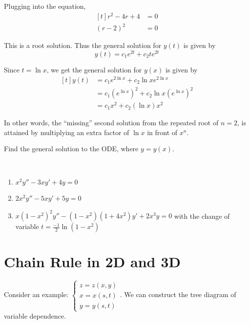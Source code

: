 \documentclass[11pt,fleqn]{book} %
\begin{document}
\begin{example}
    Plugging into the equation, 
    $$\begin{aligned}[t]
        r^2 - 4r + 4 & = 0 \\ 
        (r - 2)^2    & = 0
    \end{aligned}$$

    This is a  root solution. Thus the general solution for $y(t)$ is given by $$y(t) = c_1 e^{2t} + c_2 t e^{2t}$$

    Since $t = \ln{x}$, we get the general solution for $y(x)$ is given by 
    $$\begin{aligned}[t]
        y(t) & = c_1 e^{2 \ln{x}} + c_2 \ln{x} e^{2 \ln{x}}                               \\
             & = c_1 \left( e^{\ln{x}} \right)^2 + c_2 \ln{x} \left( e^{\ln{x}} \right)^2 \\
             & = c_1 x^2 + c_2 (\ln{x}) x^2
    \end{aligned}$$
\end{example}

In other words, the ``missing'' second solution from the repeated root of $n = 2$, is attained by multiplying an extra factor of $\ln{x}$ in front of $x^n$.

\begin{exercise}
    Find the general solution to the ODE, where $y = y(x)$.

    {~~~}

    \begin{enumerate}
        \item $x^2y'' - 3xy' + 4y = 0$
        \item $2x^2y'' - 5xy' + 5y = 0$
        \item $x(1 - x^2)^2y'' - (1 - x^2)(1 + 4x^2)y' + 2x^3y = 0$ with the change of variable $t = \frac{-1}{2} \ln(1 - x^2)$
    \end{enumerate}
\end{exercise}

\section{Chain Rule in 2D and 3D}

Consider an example: $\begin{cases}z = z(x, y) \\ x = x(s, t) \\ y = y(s, t) \end{cases}$. We can construct the tree diagram of variable dependence.
\end{document}
